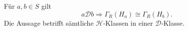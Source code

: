 \begin{theorem}
\label{b28guide:thm:schutzenberger-invariance}
Für $a,b\in S$ gilt
\[
a\mathrel{\mathcal D}b
\Longrightarrow
\Gamma_R(H_a)\cong\Gamma_R(H_b).
\]
Die Aussage betrifft sämtliche $\mathcal H$-Klassen in einer
$\mathcal D$-Klasse.
\cite{brookes2024,howie}
\end{theorem}
